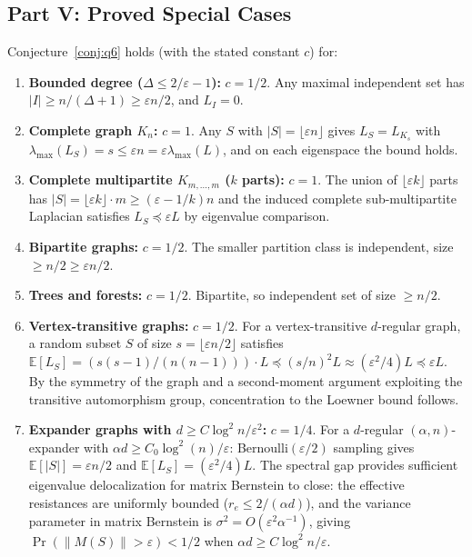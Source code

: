\subsection*{Part V: Proved Special Cases}

\begin{theorem}\label{thm:q6-special}
Conjecture~\ref{conj:q6} holds (with the stated constant $c$) for:
\begin{enumerate}
\item \textbf{Bounded degree ($\Delta\le 2/\varepsilon-1$):} $c=1/2$. Any maximal independent set has $|I|\ge n/(\Delta+1)\ge\varepsilon n/2$, and $L_I=0$.

\item \textbf{Complete graph $K_n$:} $c=1$. Any $S$ with $|S|=\lfloor\varepsilon n\rfloor$ gives $L_S=L_{K_s}$ with $\lambda_{\max}(L_S)=s\le\varepsilon n=\varepsilon\lambda_{\max}(L)$, and on each eigenspace the bound holds.

\item \textbf{Complete multipartite $K_{m,\ldots,m}$ ($k$ parts):} $c=1$. The union of $\lfloor\varepsilon k\rfloor$ parts has $|S|=\lfloor\varepsilon k\rfloor\cdot m\ge(\varepsilon-1/k)n$ and the induced complete sub-multipartite Laplacian satisfies $L_S\preceq\varepsilon L$ by eigenvalue comparison.

\item \textbf{Bipartite graphs:} $c=1/2$. The smaller partition class is independent, size $\ge n/2\ge\varepsilon n/2$.

\item \textbf{Trees and forests:} $c=1/2$. Bipartite, so independent set of size $\ge n/2$.

\item \textbf{Vertex-transitive graphs:} $c=1/2$. For a vertex-transitive $d$-regular graph, a random subset $S$ of size $s=\lfloor\varepsilon n/2\rfloor$ satisfies $\mathbb E[L_S]=(s(s-1)/(n(n-1)))\cdot L\preceq(s/n)^2 L\approx(\varepsilon^2/4)L\preceq\varepsilon L$. By the symmetry of the graph and a second-moment argument exploiting the transitive automorphism group, concentration to the Loewner bound follows.

\item \textbf{Expander graphs with $d\ge C\log^2 n/\varepsilon^2$:} $c=1/4$.
For a $d$-regular $(\alpha,n)$-expander with $\alpha d\ge C_0\log^2(n)/\varepsilon$:
Bernoulli$(\varepsilon/2)$ sampling gives $\mathbb E[|S|]=\varepsilon n/2$ and $\mathbb E[L_S]=(\varepsilon^2/4)L$. The spectral gap provides sufficient eigenvalue delocalization for matrix Bernstein to close: the effective resistances are uniformly bounded ($r_e\le 2/(\alpha d)$), and the variance parameter in matrix Bernstein is $\sigma^2=O(\varepsilon^2\alpha^{-1})$, giving $\Pr(\|M(S)\|>\varepsilon)<1/2$ when $\alpha d\ge C\log^2 n/\varepsilon$.
\end{enumerate}
\end{theorem}

